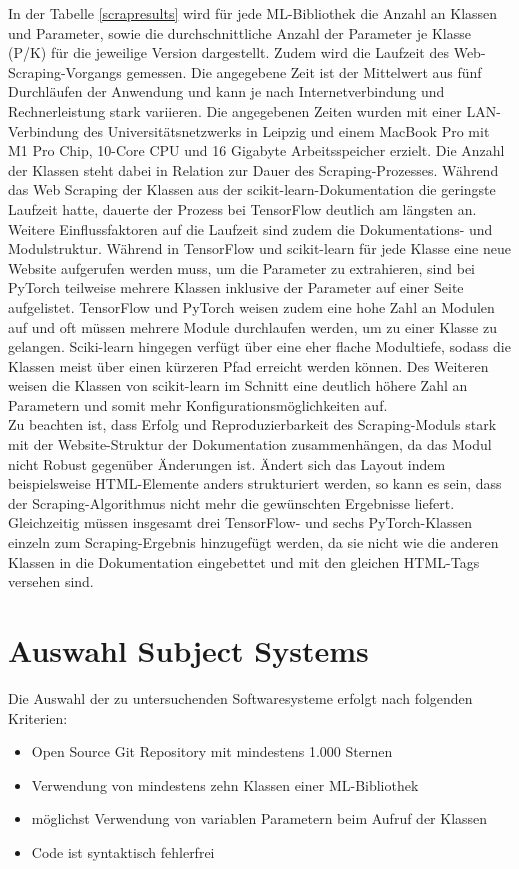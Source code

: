 \documentclass[german,bachelor]{swsLeipzig}
\begin{document}
In der Tabelle \ref{scrapresults} wird für jede ML-Bibliothek die Anzahl an Klassen und Parameter, sowie die durchschnittliche
Anzahl der Parameter je Klasse (P/K) für die jeweilige Version dargestellt.
Zudem wird die Laufzeit des Web-Scraping-Vorgangs gemessen.
Die angegebene Zeit ist der Mittelwert aus fünf Durchläufen der Anwendung und kann je nach Internetverbindung und Rechnerleistung
stark variieren.
Die angegebenen Zeiten wurden mit einer LAN-Verbindung des Universitätsnetzwerks in Leipzig und
einem MacBook Pro mit M1 Pro Chip, 10-Core CPU und 16 Gigabyte Arbeitsspeicher erzielt.
Die Anzahl der Klassen steht dabei in Relation zur Dauer des Scraping-Prozesses.
Während das Web Scraping der Klassen aus der scikit-learn-Dokumentation die geringste Laufzeit hatte,
dauerte der Prozess bei TensorFlow deutlich am längsten an.
Weitere Einflussfaktoren auf die Laufzeit sind zudem die Dokumentations- und Modulstruktur.
Während in TensorFlow und scikit-learn für jede Klasse eine neue Website aufgerufen werden muss, um die Parameter zu extrahieren,
sind bei PyTorch teilweise mehrere Klassen inklusive der Parameter auf einer Seite aufgelistet.
TensorFlow und PyTorch weisen zudem eine hohe Zahl an Modulen auf und oft müssen mehrere Module durchlaufen werden, um zu einer Klasse zu gelangen.
Sciki-learn hingegen verfügt über eine eher flache Modultiefe, sodass die Klassen meist über einen kürzeren Pfad erreicht werden können.
Des Weiteren weisen die Klassen von scikit-learn im Schnitt eine deutlich höhere Zahl an Parametern und somit mehr Konfigurationsmöglichkeiten auf.\\
\indent Zu beachten ist, dass Erfolg und Reproduzierbarkeit des Scraping-Moduls stark mit der Website-Struktur der Dokumentation zusammenhängen,
da das Modul nicht Robust gegenüber Änderungen ist.
Ändert sich das Layout indem beispielsweise HTML-Elemente anders strukturiert werden, so kann es sein, dass der Scraping-Algorithmus nicht mehr die
gewünschten Ergebnisse liefert.
Gleichzeitig müssen insgesamt drei TensorFlow- und sechs PyTorch-Klassen einzeln zum Scraping-Ergebnis hinzugefügt werden,
da sie nicht wie die anderen Klassen in die Dokumentation eingebettet und mit den gleichen HTML-Tags versehen sind.\\

\section{Auswahl Subject Systems}
Die Auswahl der zu untersuchenden Softwaresysteme erfolgt nach folgenden Kriterien:
\begin{itemize}
 \item Open Source Git Repository mit mindestens 1.000 Sternen
 \item Verwendung von mindestens zehn Klassen einer ML-Bibliothek
 \item möglichst Verwendung von variablen Parametern beim Aufruf der Klassen
 \item Code ist syntaktisch fehlerfrei
\end{itemize}
\end{document}
